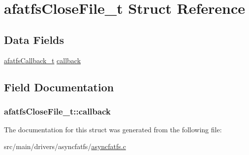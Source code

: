 \hypertarget{structafatfsCloseFile__t}{\section{afatfs\+Close\+File\+\_\+t Struct Reference}
\label{structafatfsCloseFile__t}
}
\subsection*{Data Fields}
\begin{DoxyCompactItemize}
\item 
\hyperlink{asyncfatfs_8h_aa4837467d0a7947ee352ef3650a17bdf}{afatfs\+Callback\+\_\+t} \hyperlink{structafatfsCloseFile__t_a76152c40f39169f172d67f9170f06d37}{callback}
\end{DoxyCompactItemize}


\subsection{Field Documentation}
\hypertarget{structafatfsCloseFile__t_a76152c40f39169f172d67f9170f06d37}{
\subsubsection[{callback}]{ afatfs\+Close\+File\+\_\+t\+::callback}}\label{structafatfsCloseFile__t_a76152c40f39169f172d67f9170f06d37}


The documentation for this struct was generated from the following file\+:\begin{DoxyCompactItemize}
\item 
src/main/drivers/asyncfatfs/\hyperlink{asyncfatfs_8c}{asyncfatfs.\+c}\end{DoxyCompactItemize}
